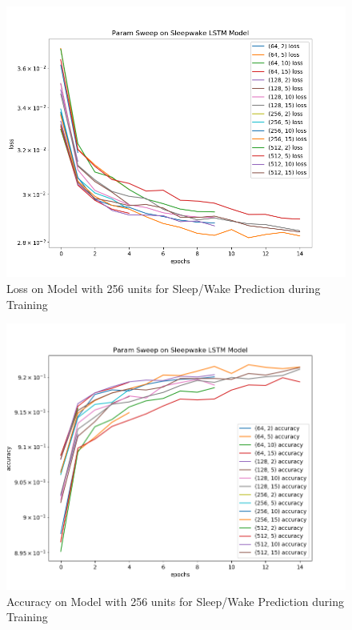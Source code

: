 \documentclass[12pt]{report}
\begin{document}
\begin{figure}
  \begin{center}
    \includegraphics[width=0.9\linewidth]{param_sweep_loss}
    \caption{Loss on Model with 256 units for Sleep/Wake Prediction during Training}
    \label{lstm-loss}
  \end{center}
\end{figure}

\begin{figure}
  \begin{center}
    \includegraphics[width=0.9\linewidth]{param_sweep_accuracy}
    \caption{Accuracy on Model with 256 units for Sleep/Wake Prediction during Training}
    \label{lstm-accuracy}
  \end{center}
\end{figure}
\end{document}
